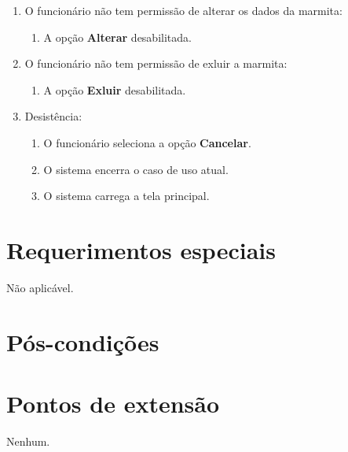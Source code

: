 \begin{enumerate}
	\item O funcionário não tem permissão de alterar os dados da marmita:
	\begin{enumerate}
		\item A opção \textbf{Alterar} desabilitada.
	\end{enumerate}
	\item O funcionário não tem permissão de exluir a marmita:
	\begin{enumerate}
		\item A opção \textbf{Exluir} desabilitada.
	\end{enumerate}	
	\item Desistência:
	\begin{enumerate}
		\item O funcionário seleciona a opção \textbf{Cancelar}.
		\item O sistema encerra o caso de uso atual.
		\item O sistema carrega a tela principal.
	\end{enumerate}
\end{enumerate}

\section{Requerimentos especiais}

Não aplicável.

\section{Pós-condições}

\section{Pontos de extensão}

Nenhum.